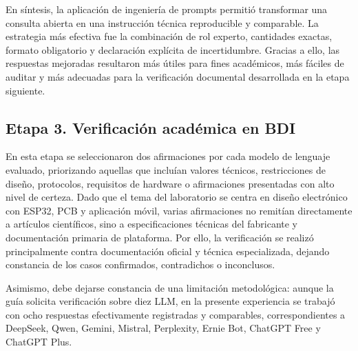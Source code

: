 \documentclass[11pt,a4paper]{article}
\begin{document}
En síntesis, la aplicación de ingeniería de prompts permitió transformar una consulta abierta en una instrucción técnica reproducible y comparable. La estrategia más efectiva fue la combinación de rol experto, cantidades exactas, formato obligatorio y declaración explícita de incertidumbre. Gracias a ello, las respuestas mejoradas resultaron más útiles para fines académicos, más fáciles de auditar y más adecuadas para la verificación documental desarrollada en la etapa siguiente.


\subsection{Etapa 3. Verificación académica en BDI}

En esta etapa se seleccionaron dos afirmaciones por cada modelo de lenguaje evaluado, priorizando aquellas que incluían valores técnicos, restricciones de diseño, protocolos, requisitos de hardware o afirmaciones presentadas con alto nivel de certeza. Dado que el tema del laboratorio se centra en diseño electrónico con ESP32, PCB y aplicación móvil, varias afirmaciones no remitían directamente a artículos científicos, sino a especificaciones técnicas del fabricante y documentación primaria de plataforma. Por ello, la verificación se realizó principalmente contra documentación oficial y técnica especializada, dejando constancia de los casos confirmados, contradichos o inconclusos.

Asimismo, debe dejarse constancia de una limitación metodológica: aunque la guía solicita verificación sobre diez LLM, en la presente experiencia se trabajó con ocho respuestas efectivamente registradas y comparables, correspondientes a DeepSeek, Qwen, Gemini, Mistral, Perplexity, Ernie Bot, ChatGPT Free y ChatGPT Plus.
\end{document}
